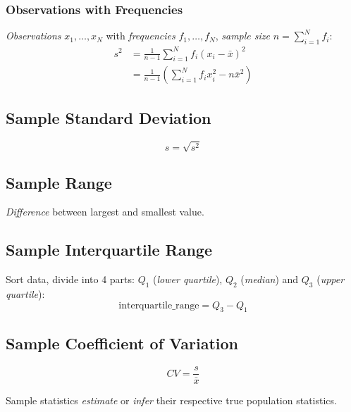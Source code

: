 \subsubsection*{Observations with Frequencies}

\textit{Observations} $x_1, \dots, x_N$ with \textit{frequencies} $f_1, \dots, f_N$, \textit{sample size} $n = \sum \nolimits_{i=1}^{N} f_i$:
\begin{align*}
    s^2
    &= \frac{1}{n - 1} \sum \limits_{i = 1}^{N} f_i \left( x_i - \bar{x} \right)^2 \\
    &= \frac{1}{n - 1} \left( \sum \limits_{i = 1}^{N} f_i x_i^2 - n \bar{x}^2 \right)
\end{align*}

\subsection*{Sample Standard Deviation}

\begin{equation*}
    s = \sqrt{s^2}
\end{equation*}

\subsection*{Sample Range}

\textit{Difference} between largest and smallest value.

\subsection*{Sample Interquartile Range}

Sort data, divide into 4 parts: $Q_1$ (\textit{lower quartile}), $Q_2$ (\textit{median}) and $Q_3$ (\textit{upper quartile}):
\begin{equation*}
    \text{interquartile\_range} = Q_3 - Q_1
\end{equation*}

\subsection*{Sample Coefficient of Variation}

\begin{equation*}
    CV = \frac{s}{\bar{x}}
\end{equation*}

\begin{remark}
    Sample statistics \textit{estimate} or \textit{infer} their respective true population statistics.
\end{remark}

